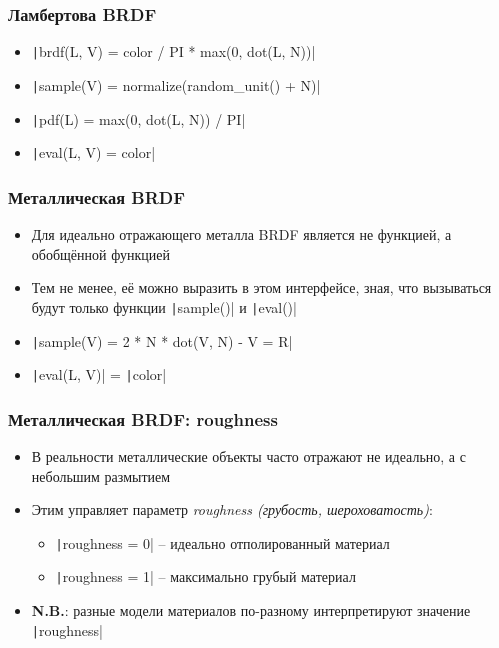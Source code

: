 \documentclass[10pt]{beamer}
\begin{document}
\begin{frame}
\frametitle{Ламбертова BRDF}
\begin{itemize}
\item \texttt|brdf(L, V) = color / PI * max(0, dot(L, N))|
\pause
\item \texttt|sample(V) = normalize(random_unit() + N)|
\pause
\item \texttt|pdf(L) = max(0, dot(L, N)) / PI|
\pause
\item \texttt|eval(L, V) = color|
\end{itemize}
\end{frame}

\begin{frame}
\frametitle{Металлическая BRDF}
\begin{itemize}
\item Для идеально отражающего металла BRDF является не функцией, а обобщённой функцией
\pause
\item Тем не менее, её можно выразить в этом интерфейсе, зная, что вызываться будут только функции \texttt|sample()| и \texttt|eval()|
\pause
\item \texttt|sample(V) = 2 * N * dot(V, N) - V = R|
\pause
\item \texttt|eval(L, V)| = \texttt|color|
\end{itemize}
\end{frame}

\begin{frame}
\frametitle{Металлическая BRDF: roughness}
\begin{itemize}
\item В реальности металлические объекты часто отражают не идеально, а с небольшим размытием
\pause
\item Этим управляет параметр \textit{roughness (грубость, шероховатость)}:
\pause
\begin{itemize}
\item \texttt|roughness = 0| -- идеально отполированный материал
\pause
\item \texttt|roughness = 1| -- максимально грубый материал
\end{itemize}
\pause
\item \textbf{\alert{N.B.}}: разные модели материалов по-разному интерпретируют значение \texttt|roughness|
\end{itemize}
\end{frame}
\end{document}
